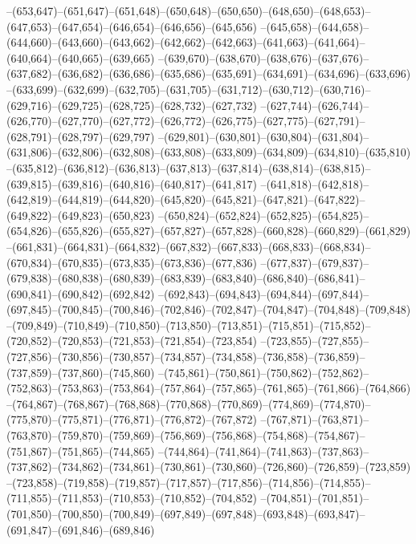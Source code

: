 --(653,647)--(651,647)--(651,648)--(650,648)--(650,650)--(648,650)--(648,653)--(647,653)--(647,654)--(646,654)--(646,656)--(645,656)
--(645,658)--(644,658)--(644,660)--(643,660)--(643,662)--(642,662)--(642,663)--(641,663)--(641,664)--(640,664)--(640,665)--(639,665)
--(639,670)--(638,670)--(638,676)--(637,676)--(637,682)--(636,682)--(636,686)--(635,686)--(635,691)--(634,691)--(634,696)--(633,696)
--(633,699)--(632,699)--(632,705)--(631,705)--(631,712)--(630,712)--(630,716)--(629,716)--(629,725)--(628,725)--(628,732)--(627,732)
--(627,744)--(626,744)--(626,770)--(627,770)--(627,772)--(626,772)--(626,775)--(627,775)--(627,791)--(628,791)--(628,797)--(629,797)
--(629,801)--(630,801)--(630,804)--(631,804)--(631,806)--(632,806)--(632,808)--(633,808)--(633,809)--(634,809)--(634,810)--(635,810)
--(635,812)--(636,812)--(636,813)--(637,813)--(637,814)--(638,814)--(638,815)--(639,815)--(639,816)--(640,816)--(640,817)--(641,817)
--(641,818)--(642,818)--(642,819)--(644,819)--(644,820)--(645,820)--(645,821)--(647,821)--(647,822)--(649,822)--(649,823)--(650,823)
--(650,824)--(652,824)--(652,825)--(654,825)--(654,826)--(655,826)--(655,827)--(657,827)--(657,828)--(660,828)--(660,829)--(661,829)
--(661,831)--(664,831)--(664,832)--(667,832)--(667,833)--(668,833)--(668,834)--(670,834)--(670,835)--(673,835)--(673,836)--(677,836)
--(677,837)--(679,837)--(679,838)--(680,838)--(680,839)--(683,839)--(683,840)--(686,840)--(686,841)--(690,841)--(690,842)--(692,842)
--(692,843)--(694,843)--(694,844)--(697,844)--(697,845)--(700,845)--(700,846)--(702,846)--(702,847)--(704,847)--(704,848)--(709,848)
--(709,849)--(710,849)--(710,850)--(713,850)--(713,851)--(715,851)--(715,852)--(720,852)--(720,853)--(721,853)--(721,854)--(723,854)
--(723,855)--(727,855)--(727,856)--(730,856)--(730,857)--(734,857)--(734,858)--(736,858)--(736,859)--(737,859)--(737,860)--(745,860)
--(745,861)--(750,861)--(750,862)--(752,862)--(752,863)--(753,863)--(753,864)--(757,864)--(757,865)--(761,865)--(761,866)--(764,866)
--(764,867)--(768,867)--(768,868)--(770,868)--(770,869)--(774,869)--(774,870)--(775,870)--(775,871)--(776,871)--(776,872)--(767,872)
--(767,871)--(763,871)--(763,870)--(759,870)--(759,869)--(756,869)--(756,868)--(754,868)--(754,867)--(751,867)--(751,865)--(744,865)
--(744,864)--(741,864)--(741,863)--(737,863)--(737,862)--(734,862)--(734,861)--(730,861)--(730,860)--(726,860)--(726,859)--(723,859)
--(723,858)--(719,858)--(719,857)--(717,857)--(717,856)--(714,856)--(714,855)--(711,855)--(711,853)--(710,853)--(710,852)--(704,852)
--(704,851)--(701,851)--(701,850)--(700,850)--(700,849)--(697,849)--(697,848)--(693,848)--(693,847)--(691,847)--(691,846)--(689,846)
